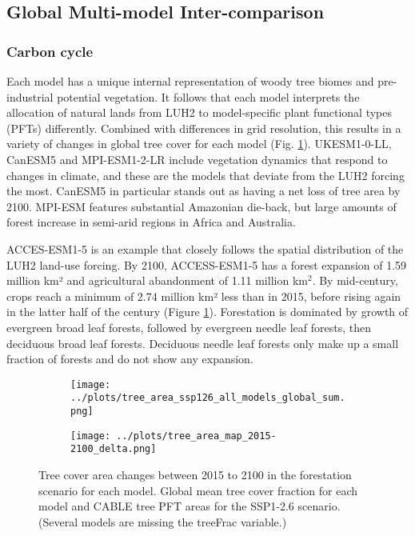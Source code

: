 \documentclass[]{article}
\begin{document}
\subsection{Global Multi-model Inter-comparison}

\subsubsection{Carbon cycle}

Each model has a unique internal representation of woody tree biomes and pre-industrial potential vegetation.
It follows that each model interprets the allocation of natural lands from LUH2 to model-specific plant functional types (PFTs) differently.
Combined with differences in grid resolution, this results in a variety of changes in global tree cover for each model (Fig. \ref{fig:land_use_map}).
UKESM1-0-LL, CanESM5 and MPI-ESM1-2-LR include vegetation dynamics that respond to changes in climate, and these are the models that deviate from the LUH2 forcing the most.
CanESM5 in particular stands out as having a net loss of tree area by 2100.
MPI-ESM features substantial Amazonian die-back, but large amounts of forest increase in semi-arid regions in Africa and Australia.

ACCES-ESM1-5 is an example that closely follows the spatial distribution of the LUH2 land-use forcing.
By 2100, ACCESS-ESM1-5 has a forest expansion of 1.59 million km² and agricultural abandonment of 1.11 million km$^2$.
By mid-century, crops reach a minimum of 2.74 million km² less than in 2015, before rising again in the latter half of the century (Figure \ref{fig:land_use_map}).
Forestation is dominated by growth of evergreen broad leaf forests, followed by evergreen needle leaf forests, then deciduous broad leaf forests.
Deciduous needle leaf forests only make up a small fraction of forests and do not show any expansion.

\begin{figure}[H]
    \centering
    \begin{subfigure}[b]{0.9\linewidth}
        \texttt{[image: ../plots/tree\_area\_ssp126\_all\_models\_global\_sum.png]}
    \end{subfigure}
    \begin{subfigure}[b]{0.9\linewidth}
        \texttt{[image: ../plots/tree\_area\_map\_2015-2100\_delta.png]}
    \end{subfigure}
    \caption{Tree cover area changes between 2015 to 2100 in the forestation scenario for each model. Global mean tree cover fraction for each model and CABLE tree PFT areas for the SSP1-2.6 scenario. (Several models are missing the treeFrac variable.)}
    \label{fig:land_use_map}
\end{figure}
\end{document}

